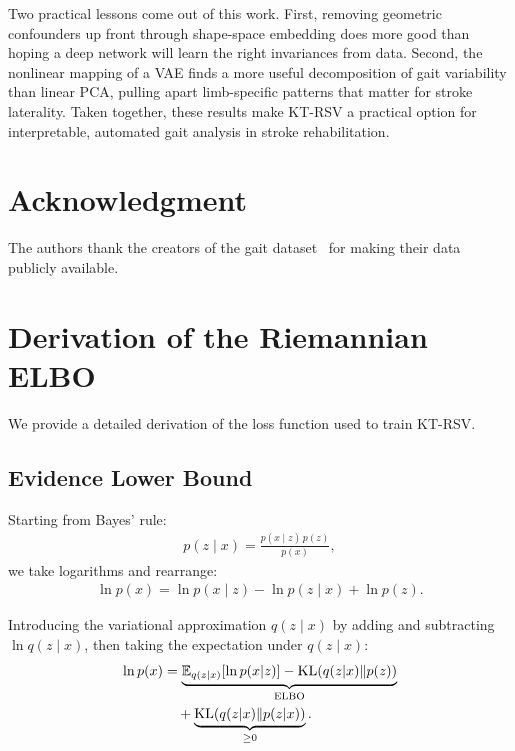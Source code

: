 \documentclass{article}
\begin{document}
Two practical lessons come out of this work. First, removing geometric confounders up front through shape-space embedding does more good than hoping a deep network will learn the right invariances from data. Second, the nonlinear mapping of a VAE finds a more useful decomposition of gait variability than linear PCA, pulling apart limb-specific patterns that matter for stroke laterality. Taken together, these results make KT-RSV a practical option for interpretable, automated gait analysis in stroke rehabilitation.


\section*{Acknowledgment}
The authors thank the creators of the gait dataset~\cite{van2023full} for making their data publicly available.


\newpage
\onecolumn
\appendix

\section{Derivation of the Riemannian ELBO}
\label{app:elbo}

We provide a detailed derivation of the loss function used to train KT-RSV.

\subsection{Evidence Lower Bound}
Starting from Bayes' rule:
\begin{align}
p(z \mid x) = \frac{p(x \mid z)\,p(z)}{p(x)},
\end{align}
we take logarithms and rearrange:
\begin{align}
\ln p(x) = \ln p(x \mid z) - \ln p(z \mid x) + \ln p(z).
\end{align}

Introducing the variational approximation $q(z \mid x)$ by adding and subtracting $\ln q(z \mid x)$, then taking the expectation under $q(z \mid x)$:
\begin{align}
\ln p(x) &= \underbrace{\mathbb{E}_{q(z|x)}[\ln p(x|z)] - \mathrm{KL}(q(z|x) \| p(z))}_{\text{ELBO}} \notag \\
&\quad + \underbrace{\mathrm{KL}(q(z|x) \| p(z|x))}_{\geq 0}.
\end{align}
\end{document}
